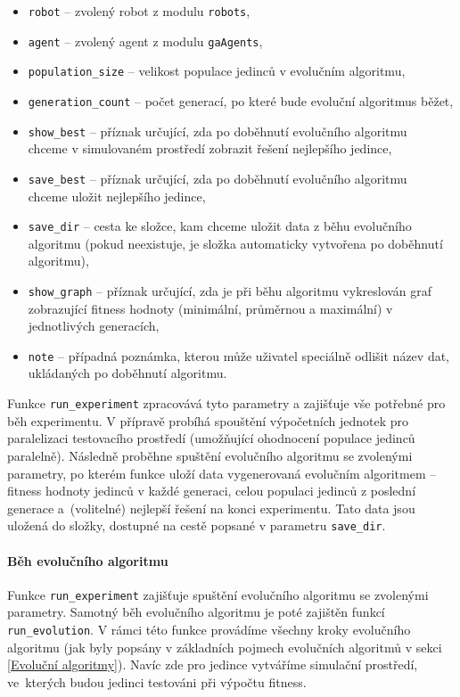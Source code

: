 \begin{itemize}
    \item \texttt{robot} -- zvolený robot z modulu \texttt{robots},
    \item \texttt{agent} -- zvolený agent z modulu \texttt{gaAgents},
    \item \texttt{population\_size} -- velikost populace jedinců v
        evolučním algoritmu,
    \item \texttt{generation\_count} -- počet generací, po které bude
        evoluční algoritmus běžet,
    \item \texttt{show\_best} -- příznak určující, zda po doběhnutí evolučního
        algoritmu \\chceme v simulovaném prostředí zobrazit řešení nejlepšího
        jedince,
    \item \texttt{save\_best} -- příznak určující, zda po doběhnutí evolučního
        algoritmu \\chceme uložit nejlepšího jedince,
    \item \texttt{save\_dir} -- cesta ke složce, kam chceme uložit data z běhu
        evolučního algoritmu (pokud neexistuje, je složka automaticky vytvořena
        po doběhnutí algoritmu),
    \item \texttt{show\_graph} -- příznak určující, zda je při běhu algoritmu
        vykreslován graf zobrazující fitness hodnoty (minimální, průměrnou a
        maximální) v jednotlivých generacích,
    \item \texttt{note} -- případná poznámka, kterou může uživatel speciálně
        odlišit název dat, ukládaných po doběhnutí algoritmu.
\end{itemize}

Funkce \texttt{run\_experiment} zpracovává tyto parametry a zajišťuje vše
potřebné pro běh experimentu. V přípravě probíhá spouštění výpočetních
jednotek pro paralelizaci testovacího prostředí (umožňující ohodnocení
populace jedinců paralelně). Následně proběhne spuštění evolučního algoritmu se
zvolenými parametry, po kterém funkce uloží data vygenerovaná evolučním
algoritmem -- fitness hodnoty jedinců v každé generaci, celou
populaci jedinců z poslední generace a~(volitelné) nejlepší řešení na konci
experimentu. Tato data jsou uložená do složky, dostupné na cestě popsané v
parametru \texttt{save\_dir}.

\paragraph{Běh evolučního algoritmu}
Funkce \texttt{run\_experiment} zajišťuje spuštění evolučního algoritmu se
zvolenými parametry. Samotný běh evolučního algoritmu je poté zajištěn funkcí
\texttt{run\_evolution}. V rámci této funkce provádíme všechny kroky evolučního
algoritmu (jak byly popsány v základních pojmech evolučních algoritmů v sekci
\ref{Evoluční algoritmy}). Navíc zde pro jedince vytváříme simulační prostředí,
ve~kterých budou jedinci testováni při výpočtu fitness.

